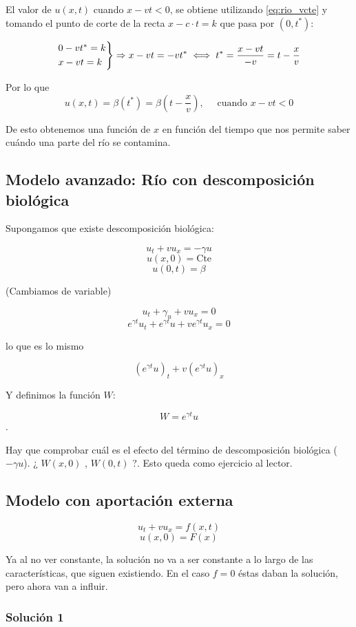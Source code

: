 		El valor de $u(x,t)$ cuando $x-vt < 0$, se obtiene utilizando \ref{eq:rio_vcte} y tomando el punto de corte de la recta $x-c \cdot t=k$ que pasa por $(0,t^*)$:

		$$
		\begin{rcases}
			0 - vt^{*} = k \\
			x - vt = k
		\end{rcases}
		 \Rightarrow x-vt = -vt^{*} \iff t^* = \frac{x-vt}{-v} = t - \frac{x}{v}$$

		Por lo que
		$$u(x,t) = \beta(t^*) = \beta(t - \frac{x}{v}), \quad \text{ cuando } x - vt < 0$$

		De esto obtenemos una función de $x$ en función del tiempo que nos permite saber cuándo una parte del río se contamina.

	\subsection{Modelo avanzado: Río con descomposición biológica}

		Supongamos que existe descomposición biológica:

		$$u_t + vu_x = -\gamma u$$
		$$u(x,0) = \text{Cte}$$
		$$u(0,t) = \beta$$

		(Cambiamos de variable)

		$$u_t + \gamma_u + vu_x = 0$$
		$$e^{\gamma t} u_t + e^{\gamma t} u + v e^{ \gamma t} u_x = 0 $$

		lo que es lo mismo

		$$(e^{\gamma t}u)_t + v (e^{\gamma t} u)_x$$

		Y definimos la función $W$:

		$$W = e^{\gamma t}u$$.


		Hay que comprobar cuál es el efecto del término de descomposición biológica ($-\gamma u$). ¿ $W(x,0)$ , $ W(0,t)$ ?. Esto queda como ejercicio al lector.


	\subsection{Modelo con aportación externa}

		$$u_t + vu_x = f(x,t)$$
		$$u(x,0) = F(x)$$

		Ya al no ver constante, la solución no va a ser constante a lo largo de las características, que siguen existiendo. En el caso $f = 0$ éstas daban la solución, pero ahora van a influir.


		\subsubsection{Solución 1}

